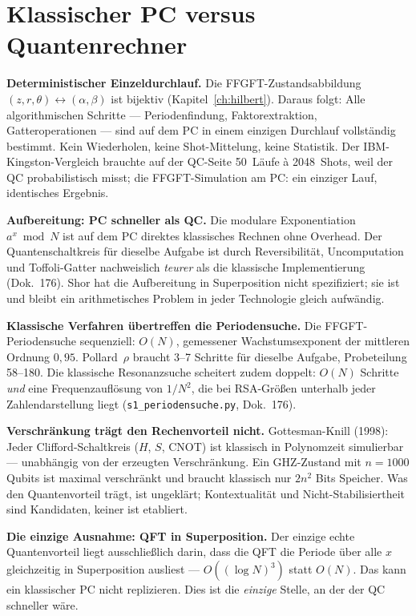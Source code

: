 \section{Klassischer PC versus Quantenrechner}

\textbf{Deterministischer Einzeldurchlauf.}
Die FFGFT-Zustandsabbildung $(z,r,\theta)\leftrightarrow(\alpha,\beta)$
ist bijektiv (Kapitel~\ref{ch:hilbert}). Daraus folgt: Alle
algorithmischen Schritte --- Periodenfindung, Faktorextraktion,
Gatteroperationen --- sind auf dem PC in einem einzigen Durchlauf
vollständig bestimmt. Kein Wiederholen, keine Shot-Mittelung, keine
Statistik. Der IBM-Kingston-Vergleich brauchte auf der QC-Seite
50~Läufe à 2048~Shots, weil der QC probabilistisch misst; die
FFGFT-Simulation am PC: ein einziger Lauf, identisches Ergebnis.

\textbf{Aufbereitung: PC schneller als QC.}
Die modulare Exponentiation $a^x\bmod N$ ist auf dem PC direktes
klassisches Rechnen ohne Overhead. Der Quantenschaltkreis für
dieselbe Aufgabe ist durch Reversibilität, Uncomputation und
Toffoli-Gatter nachweislich \emph{teurer} als die klassische
Implementierung (Dok.~176). Shor hat die Aufbereitung in
Superposition nicht spezifiziert; sie ist und bleibt ein
arithmetisches Problem in jeder Technologie gleich aufwändig.

\textbf{Klassische Verfahren übertreffen die Periodensuche.}
Die FFGFT-Periodensuche sequenziell: $O(N)$, gemessener
Wachstumsexponent der mittleren Ordnung $0{,}95$. Pollard~$\rho$
braucht 3--7 Schritte für dieselbe Aufgabe, Probeteilung 58--180.
Die klassische Resonanzsuche scheitert zudem doppelt: $O(N)$
Schritte \emph{und} eine Frequenzauflösung von $1/N^2$, die bei
RSA-Größen unterhalb jeder Zahlendarstellung liegt
(\texttt{s1\_periodensuche.py}, Dok.~176).

\textbf{Verschränkung trägt den Rechenvorteil nicht.}
Gottesman-Knill (1998): Jeder Clifford-Schaltkreis ($H$, $S$,
CNOT) ist klassisch in Polynomzeit simulierbar --- unabhängig von
der erzeugten Verschränkung. Ein GHZ-Zustand mit $n = 1000$
Qubits ist maximal verschränkt und braucht klassisch nur $2n^2$
Bits Speicher. Was den Quantenvorteil trägt, ist ungeklärt;
Kontextualität und Nicht-Stabilisiertheit sind Kandidaten, keiner
ist etabliert.

\textbf{Die einzige Ausnahme: QFT in Superposition.}
Der einzige echte Quantenvorteil liegt ausschließlich darin,
dass die QFT die Periode über alle $x$ gleichzeitig in
Superposition ausliest --- $O((\log N)^3)$ statt $O(N)$. Das
kann ein klassischer PC nicht replizieren. Dies ist die
\emph{einzige} Stelle, an der der QC schneller wäre.

